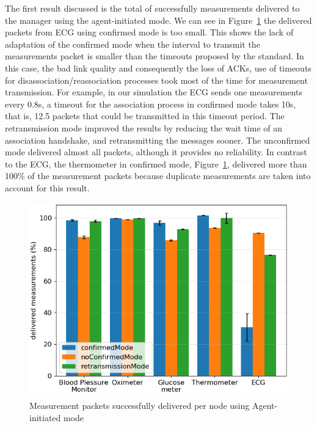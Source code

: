 The first result discussed is the total of successfully measurements delivered to the manager using the agent-initiated mode.
We can see in Figure~\ref{fig:measurementsDeliveredAgentInitiated} the delivered packets from ECG using confirmed mode is too small. This shows the lack of adaptation of the confirmed mode when the interval to transmit the measurements packet is smaller than the timeouts proposed by the standard. In this case, the bad link quality and consequently the loss of ACKs, use of timeouts for disassociation/reassociation processes took most of the time for measurement transmission. For example, in our simulation the ECG sends one measurements every 0.8s, a timeout for the association process in confirmed mode takes 10s, that is, 12.5 packets that could be transmitted in this timeout period.
The retransmission mode improved the results by reducing the wait time of an association handshake, and retransmitting the messages sooner. The unconfirmed mode delivered almost all packets, although it provides no reliability.
In contrast to the ECG, the thermometer in confirmed mode, Figure~\ref{fig:measurementsDeliveredAgentInitiated}, delivered more than 100\% of the measurement packets because duplicate measurements are taken into account for this result.

\begin{figure}[htbp]
\centerline{\includegraphics[width=\linewidth]{figures/MeasurementsDelivered-AgentinitiatedMode.png}}
\caption{Measurement packets successfully delivered per node using Agent-initiated mode}
\label{fig:measurementsDeliveredAgentInitiated}
\end{figure}

